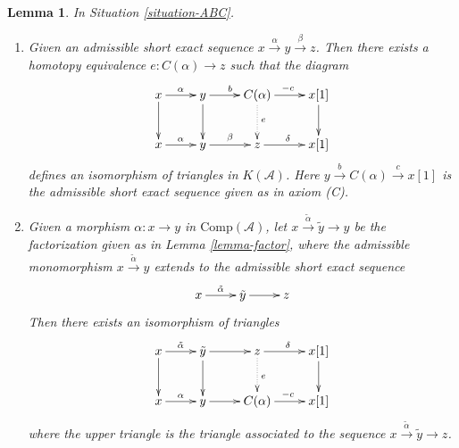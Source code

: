\documentclass{stacks-project}
\theoremstyle{plain}
\newtheorem{lemma}[subsection]{Lemma}
\theoremstyle{definition}
\theoremstyle{remark}
\numberwithin{equation}{subsection}
\begin{document}
\begin{lemma}
\label{lemma-cone-homotopy}
In Situation \ref{situation-ABC}.
\begin{enumerate}
\item Given an admissible short exact sequence
$x\xrightarrow{\alpha} y\xrightarrow{\beta} z$.
Then there exists a homotopy equivalence
$e:C(\alpha)\to z$ such that the diagram
\begin{equation}
\label{equation-cone-isom-triangle}
\vcenter{
\xymatrix{
x\ar[r]^{\alpha}\ar[d] &
y\ar[r]^{b}\ar[d] &
C(\alpha)\ar[r]^{-c}\ar@{.>}[d]^{e} &
x[1]\ar[d] \\
x\ar[r]^{\alpha} &
y\ar[r]^{\beta} &
z\ar[r]^{\delta} & x[1]
}
}
\end{equation}
defines an isomorphism of triangles in $K(\mathcal{A})$. Here
$y\xrightarrow{b}C(\alpha)\xrightarrow{c}x[1]$
is the admissible short exact sequence given as in axiom (C).
\item Given a morphism
$\alpha : x \to y$ in $\text{Comp}(\mathcal{A})$, let
$x \xrightarrow{\tilde{\alpha}} \tilde{y} \to y$ be the
factorization given as in Lemma \ref{lemma-factor}, where the admissible
monomorphism $x \xrightarrow{\tilde{\alpha}} y$ extends to the
admissible short exact sequence
$$
\xymatrix{
x \ar[r]^{\tilde{\alpha}} &
\tilde{y} \ar[r] & z
}
$$
Then there exists an isomorphism of triangles
$$
\xymatrix{
x \ar[r]^{\tilde{\alpha}} \ar[d] &
\tilde{y} \ar[r] \ar[d] &
z \ar[r]^{\delta} \ar@{.>}[d]^{e} &
x[1] \ar[d] \\
x \ar[r]^{\alpha} &
y \ar[r] &
C(\alpha) \ar[r]^{-c} &
x[1]
}
$$
where the upper triangle is the triangle
associated to the sequence
$x \xrightarrow{\tilde{\alpha}} \tilde{y} \to z$.
\end{enumerate}
\end{lemma}
\end{document}
